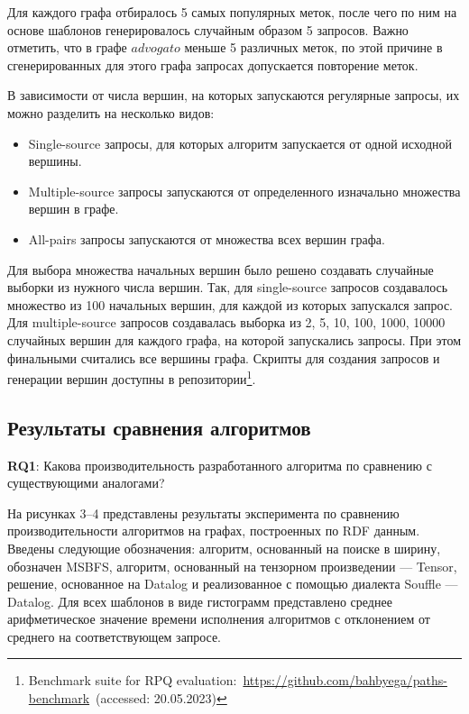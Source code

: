 Для каждого графа отбиралось 5 самых популярных меток, после чего по ним на основе шаблонов генерировалось случайным образом 5 запросов. Важно отметить, что в графе $advogato$ меньше 5 различных меток, по этой причине в сгенерированных для этого графа запросах допускается повторение меток.

В зависимости от числа вершин, на которых запускаются регулярные запросы, их можно разделить на несколько видов:
\begin{itemize}
    \item Single-source запросы, для которых алгоритм запускается от одной исходной вершины.
    \item Multiple-source запросы запускаются от определенного изначально множества вершин в графе.
    \item All-pairs запросы запускаются от множества всех вершин графа.
\end{itemize}

Для выбора множества начальных вершин было решено создавать случайные выборки из нужного числа вершин. Так, для single-source запросов создавалось множество из 100 начальных вершин, для каждой из которых запускался запрос. Для multiple-source запросов создавалась выборка из 2, 5, 10, 100, 1000, 10000 случайных вершин для каждого графа, на которой запускались запросы. При этом финальными считались все вершины графа. Скрипты для создания запросов и генерации вершин доступны в репозитории\footnote{Benchmark suite for RPQ evaluation:~\href{https://github.com/bahbyega/paths-benchmark}{https://github.com/bahbyega/paths-benchmark}~(accessed: 20.05.2023)}.

\subsection{Результаты сравнения алгоритмов}
\textbf{RQ1}: Какова производительность разработанного алгоритма по сравнению с существующими аналогами?

На рисунках 3--4 представлены результаты эксперимента по сравнению производительности алгоритмов на графах, построенных по RDF данным. Введены следующие обозначения: алгоритм, основанный на поиске в ширину, обозначен MSBFS, алгоритм, основанный на тензорном произведении --- Tensor, решение, основанное на Datalog и реализованное с помощью диалекта Souffle --- Datalog. Для всех шаблонов в виде гистограмм представлено среднее арифметическое значение времени исполнения алгоритмов с отклонением от среднего на соответствующем запросе.

